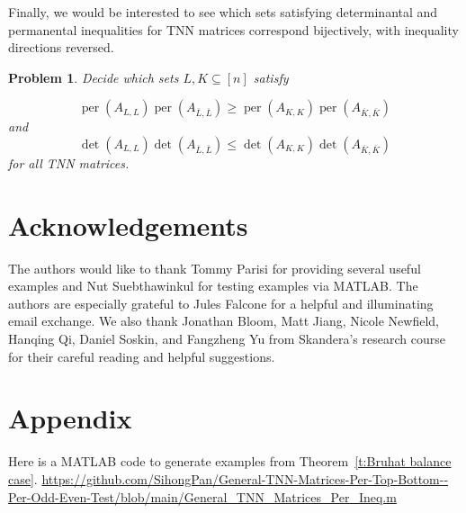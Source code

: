 \documentclass[12pt]{amsart}
\newtheorem{prob}[thm]{Problem}
\theoremstyle{definition}
\numberwithin{equation}{section}
\DeclareMathOperator{\perm}{per}
\begin{document}
Finally, we would be interested to see which sets satisfying determinantal and permanental inequalities for TNN matrices
correspond bijectively,
with inequality directions reversed.
\begin{prob}
Decide which sets $L,K \subseteq [n]$ satisfy

\begin{equation*}
\perm(A_{L,L})\perm(A_{\overline{L},\overline{L}}) \geq \perm(A_{K,K})\perm(A_{\overline{K},\overline{K}})
    \end{equation*} and \begin{equation*}
\det(A_{L,L})\det(A_{\overline{L},\overline{L}}) \leq \det(A_{K,K})\det(A_{\overline{K},\overline{K}})
    \end{equation*} for all TNN matrices.
\end{prob}

\section*{Acknowledgements}
The authors would like to thank Tommy Parisi for providing several useful examples and Nut Suebthawinkul for testing examples via MATLAB. The authors are especially grateful to Jules Falcone for a helpful and illuminating email exchange. We also thank Jonathan Bloom, Matt Jiang, Nicole Newfield, Hanqing Qi, Daniel Soskin, and Fangzheng Yu from Skandera's research course for their careful reading and helpful suggestions.

\section{Appendix}

Here is a MATLAB code to generate examples from Theorem~\ref{t:Bruhat balance case}.
\url{https://github.com/SihongPan/General-TNN-Matrices-Per-Top-Bottom--Per-Odd-Even-Test/blob/main/General_TNN_Matrices_Per_Ineq.m}


\end{document}
